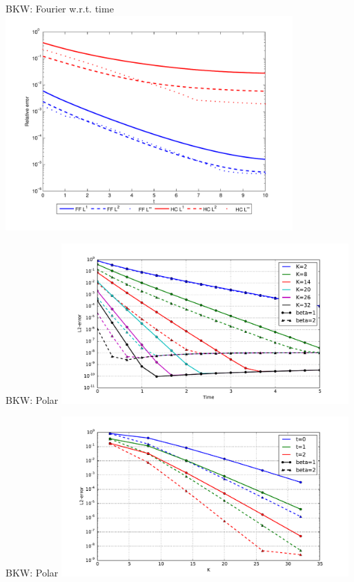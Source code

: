 \documentclass[hyperref={bookmarksopen, colorlinks, linkcolor=blue, urlcolor=green, citecolor=red}, color={usenames,dvipsnames}]{beamer}
\begin{document}
\begin{frame}{BKW: Fourier w.r.t. time}
\centering
\includegraphics[width=11cm]{../figs/hcboltz/bkwtime}
\end{frame}

\begin{frame}{BKW: Polar}
\centering
\includegraphics[width=11cm]{../figs/polboltz/bkw}
\end{frame}

\begin{frame}{BKW: Polar}
\centering
\includegraphics[width=11cm]{../figs/polboltz/bkw-flip}
\end{frame}
\end{document}
